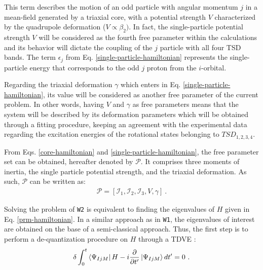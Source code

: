 \documentclass[11pt]{article}
\begin{document}
This term describes the motion of an odd particle with angular momentum $j$ in a mean-field generated by a triaxial core, with a potential strength $V$ characterized by the quadrupole deformation ($V\propto\beta_2)$. In fact, the single-particle potential strength $V$ will be considered as the fourth free parameter within the calculations and its behavior will dictate the coupling of the $j$ particle with all four TSD bands. The term $\epsilon_j$ from Eq. \ref{single-particle-hamiltonian} represents the single-particle energy that corresponds to the odd $j$ proton from the $i$-orbital.

Regarding the triaxial deformation $\gamma$ which enters in Eq. \ref{single-particle-hamiltonian}, its value will be considered as another free parameter of the current problem. In other words, having $V$ and $\gamma$ as free parameters means that the system will be described by its deformation parameters which will be obtained through a fitting procedure, keeping an agreement with the experimental data regarding the excitation energies of the rotational states belonging to $TSD_{1,2,3,4}$.

From Eqs. \ref{core-hamiltonian} and \ref{single-particle-hamiltonian}, the free parameter set can be obtained, hereafter denoted by $\mathcal{P}$. It comprises three moments of inertia, the single particle potential strength, and the triaxial deformation. As such, $\mathcal{P}$ can be written as:
\begin{align}
    \mathcal{P}=\left[\mathcal{I}_1,\mathcal{I}_2,\mathcal{I}_3,V,\gamma\right]\ .
    \label{parameter-set}
\end{align}

Solving the problem of \texttt{W2} is equivalent to finding the eigenvalues of $H$ given in Eq. \ref{prm-hamiltonian}. In a similar approach as in \texttt{W1}, the eigenvalues of interest are obtained on the base of a semi-classical approach. Thus, the first step is to perform a de-quantization procedure on $H$ through a TDVE \cite{raduta2007semiclassical,budaca2018tilted,raduta2017semiclassical}:
\begin{align}
    \delta\int_0^t\bra{\Psi_{IjM}}H-i\frac{\partial}{\partial t'}\ket{\Psi_{IjM}}dt'=0\ .
    \label{tdve}
\end{align}
\end{document}
